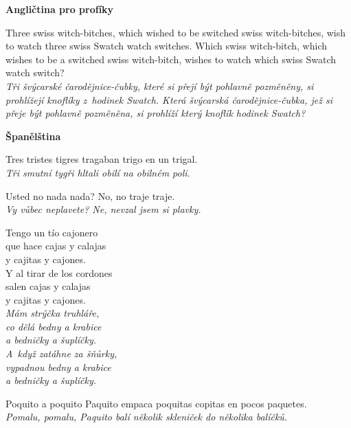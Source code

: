 \bigskip

\noindent
\textbf{Angličtina pro profíky}

\medskip

\noindent
Three swiss witch-bitches, which wished to be switched swiss witch-bitches, wish to watch three swiss Swatch watch switches. Which swiss witch-bitch, which wishes to be a switched swiss witch-bitch, wishes to watch which swiss Swatch watch switch? \\
\textit{Tři švýcarské čarodějnice-čubky, které si přejí být pohlavně pozměněny, si prohlížejí knoflíky z~hodinek Swatch. Která švýcarská čarodějnice-čubka, jež si přeje být pohlavně pozměněna, si prohlíží který knoflík hodinek Swatch?}

\medskip



\bigskip

\noindent
\textbf{Španělština}

\medskip

\noindent
Tres tristes tigres tragaban trigo en un trigal. \\
\textit{Tři smutní tygři hltali obilí na obilném poli.}

\medskip

\noindent
Usted no nada nada? No, no traje traje. \\
\textit{Vy vůbec neplavete? Ne, nevzal jsem si plavky.}

\medskip

\noindent
Tengo un tío cajonero \\
que hace cajas y calajas \\
y cajitas y cajones. \\
Y al tirar de los cordones \\
salen cajas y calajas \\
y cajitas y cajones. \\
\textit{Mám strýčka truhláře, \\ co dělá bedny a krabice \\ a bedničky a šuplíčky.  \\ A~když zatáhne za šňůrky, \\ vypadnou bedny a krabice \\ a bedničky a šuplíčky.}

\medskip

\noindent
Poquito a poquito Paquito empaca poquitas copitas en pocos paquetes. \\
\textit{Pomalu, pomalu, Paquito balí několik skleniček do několika balíčků.}

